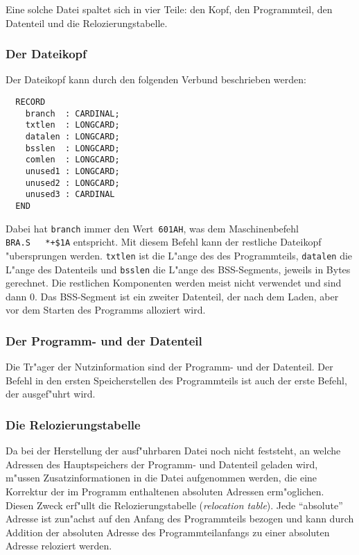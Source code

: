 Eine solche Datei spaltet sich in vier Teile:
den Kopf, den Programmteil, den Datenteil und die Relozierungstabelle.

\subsubsection{Der Dateikopf}

Der Dateikopf kann durch den folgenden Verbund beschrieben werden:
\begin{verbatim}
  RECORD
    branch  : CARDINAL;
    txtlen  : LONGCARD;
    datalen : LONGCARD;
    bsslen  : LONGCARD;
    comlen  : LONGCARD;
    unused1 : LONGCARD;
    unused2 : LONGCARD;
    unused3 : CARDINAL
  END
\end{verbatim}

Dabei hat {\tt branch} immer den Wert~{\tt 601AH}, was dem Maschinenbefehl
{\tt BRA.S\ \ \ *+\$1A} entspricht.
Mit diesem Befehl kann der restliche Dateikopf "ubersprungen werden.
{\tt txtlen} ist die L"ange des des Programmteils, {\tt datalen} die
L"ange des Datenteils und {\tt bsslen} die L"ange des BSS-Segments, jeweils
in Bytes gerechnet.
Die restlichen Komponenten werden meist nicht verwendet und sind dann 0.
Das BSS-Segment ist ein zweiter Datenteil, der nach dem Laden, aber vor
dem Starten des Programms alloziert wird.

\subsubsection{Der Programm- und der Datenteil}

Die Tr"ager der Nutzinformation sind der Programm- und der Datenteil.
Der Befehl in den ersten Speicherstellen des Programmteils ist auch der
erste Befehl, der ausgef"uhrt wird.

\subsubsection{Die Relozierungstabelle}

Da bei der Herstellung der ausf"uhrbaren Datei noch nicht feststeht, an
welche Adressen des Hauptspeichers der Programm- und Datenteil geladen wird,
m"ussen Zusatzinformationen in die Datei aufgenommen werden, die eine
Korrektur der im Programm enthaltenen absoluten Adressen erm"oglichen.
Diesen Zweck erf"ullt die Relozierungstabelle ({\it relocation table\/}).
Jede "`absolute"' Adresse ist zun"achst auf den Anfang des Programmteils bezogen
und kann durch Addition der absoluten Adresse des Programmteilanfangs zu
einer absoluten Adresse reloziert werden.

